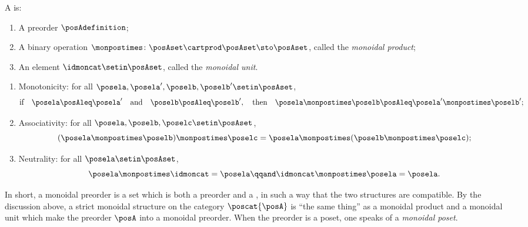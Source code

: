 \begin{ctdefinition}
    \label{def:monoidal-preorder}
    A  is:

    \constit
    \begin{enumerate}
        \item A preorder $\posAdefinition$;
        \item A binary operation $\monpostimes \colon \posAset \cartprod \posAset \sto \posAset$, called the \emph{monoidal product};
        \item An element $\idmoncat \setin \posAset$, called the \emph{monoidal unit}.
    \end{enumerate}

    \condit
    \begin{enumerate}
        \item Monotonicity: for all $\posela, \posela', \poselb, \poselb' \setin \posAset$,
              \begin{equation}
                  \label{eq:monoidal-preorder-monotonicity}
                  \text{if} \quad \posela \posAleq \posela' \quad \text{and} \quad \poselb \posAleq \poselb', \quad \text{then} \quad \posela \monpostimes \poselb \posAleq \posela' \monpostimes \poselb';
              \end{equation}
        \item Associativity: for all $\posela, \poselb, \poselc \setin \posAset$,
              \begin{equation}
                  (\posela \monpostimes \poselb) \monpostimes \poselc = \posela \monpostimes (\poselb \monpostimes \poselc);
              \end{equation}
        \item Neutrality: for all $\posela \setin \posAset$,
              \begin{equation}
                  \posela \monpostimes \idmoncat = \posela
                  \qqand
                  \idmoncat \monpostimes \posela = \posela.
              \end{equation}
    \end{enumerate}
\end{ctdefinition}

In short, a monoidal preorder is a set which is both a preorder and a , in such a way that the two structures are compatible.
By the discussion above, a strict monoidal structure on the category $\poscat{\posA}$ is ``the same thing'' as a monoidal product and a monoidal unit which make the preorder $\posA$ into a monoidal preorder.
When the preorder is a poset, one speaks of a \emph{monoidal poset}.

